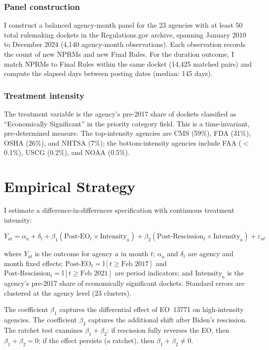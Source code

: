 \documentclass[12pt]{article}
\newcommand{\ind}{\mathbb{I}}
\begin{document}
\subsubsection*{Panel construction} I construct a balanced agency-month panel for the 23 agencies with at least 50 total rulemaking dockets in the Regulations.gov archive, spanning January 2010 to December 2024 (4,140 agency-month observations). Each observation records the count of new NPRMs and new Final Rules. For the duration outcome, I match NPRMs to Final Rules within the same docket (14,425 matched pairs) and compute the elapsed days between posting dates (median: 145 days).

\subsubsection*{Treatment intensity} The treatment variable is the agency's pre-2017 share of dockets classified as ``Economically Significant'' in the priority category field. This is a time-invariant, pre-determined measure. The top-intensity agencies are CMS (59\%), FDA (31\%), OSHA (26\%), and NHTSA (7\%); the bottom-intensity agencies include FAA ($<$0.1\%), USCG (0.2\%), and NOAA (0.5\%).



\section{Empirical Strategy}
\label{sec:strategy}

I estimate a difference-in-differences specification with continuous treatment intensity:

\begin{equation}
Y_{at} = \alpha_a + \delta_t + \beta_1 (\text{Post-EO}_t \times \text{Intensity}_a) + \beta_2 (\text{Post-Rescission}_t \times \text{Intensity}_a) + \varepsilon_{at}
\label{eq:main}
\end{equation}

\noindent where $Y_{at}$ is the outcome for agency $a$ in month $t$; $\alpha_a$ and $\delta_t$ are agency and month fixed effects; $\text{Post-EO}_t = \ind[t \geq \text{Feb 2017}]$ and $\text{Post-Rescission}_t = \ind[t \geq \text{Feb 2021}]$ are period indicators; and $\text{Intensity}_a$ is the agency's pre-2017 share of economically significant dockets. Standard errors are clustered at the agency level (23 clusters).

The coefficient $\beta_1$ captures the differential effect of EO~13771 on high-intensity agencies. The coefficient $\beta_2$ captures the additional shift after Biden's rescission. The ratchet test examines $\beta_1 + \beta_2$: if rescission fully reverses the EO, then $\beta_1 + \beta_2 = 0$; if the effect persists (a ratchet), then $\beta_1 + \beta_2 \neq 0$.
\end{document}
